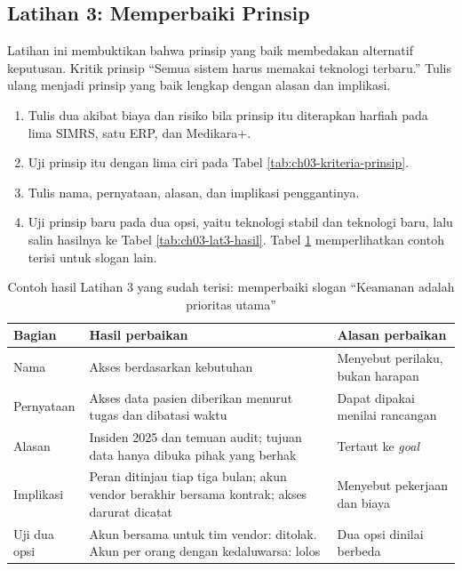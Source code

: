 \subsection*{Latihan 3: Memperbaiki Prinsip}

Latihan ini membuktikan bahwa prinsip yang baik membedakan alternatif keputusan. Kritik prinsip
``Semua sistem harus memakai teknologi terbaru.'' Tulis ulang menjadi prinsip yang baik lengkap
dengan alasan dan implikasi.

\begin{enumerate}
  \item Tulis dua akibat biaya dan risiko bila prinsip itu diterapkan harfiah pada lima SIMRS, satu
        ERP, dan Medikara+.
  \item Uji prinsip itu dengan lima ciri pada Tabel \ref{tab:ch03-kriteria-prinsip}.
  \item Tulis nama, pernyataan, alasan, dan implikasi penggantinya.
  \item Uji prinsip baru pada dua opsi, yaitu teknologi stabil dan teknologi baru, lalu salin
        hasilnya ke Tabel \ref{tab:ch03-lat3-hasil}. Tabel \ref{tab:ch03-lat3-contoh} memperlihatkan
        contoh terisi untuk slogan lain.
\end{enumerate}

\begin{table}[!htb]
  \centering
  \caption{Contoh hasil Latihan 3 yang sudah terisi: memperbaiki slogan ``Keamanan adalah prioritas
           utama''}
  \label{tab:ch03-lat3-contoh}
  \footnotesize
  \begin{tabularx}{\textwidth}{>{\raggedright\arraybackslash}p{1.7cm}>{\raggedright\arraybackslash}X>{\raggedright\arraybackslash}p{3.6cm}}
    \hline
    \textbf{Bagian} & \textbf{Hasil perbaikan} & \textbf{Alasan perbaikan} \\
    \hline
    Nama & Akses berdasarkan kebutuhan & Menyebut perilaku, bukan harapan \\
    \hline
    Pernyataan & Akses data pasien diberikan menurut tugas dan dibatasi waktu & Dapat dipakai menilai rancangan \\
    \hline
    Alasan & Insiden 2025 dan temuan audit; tujuan data hanya dibuka pihak yang berhak & Tertaut ke \textit{goal} \\
    \hline
    Implikasi & Peran ditinjau tiap tiga bulan; akun vendor berakhir bersama kontrak; akses darurat dicatat & Menyebut pekerjaan dan biaya \\
    \hline
    Uji dua opsi & Akun bersama untuk tim vendor: ditolak. Akun per orang dengan kedaluwarsa: lolos & Dua opsi dinilai berbeda \\
    \hline
  \end{tabularx}
\end{table}

